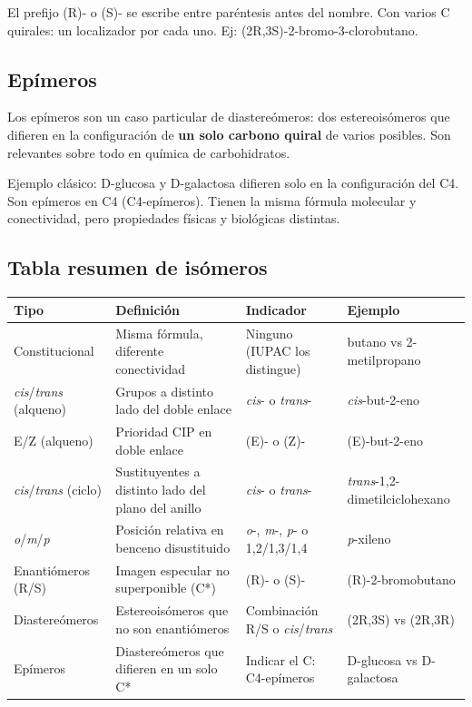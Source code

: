 El prefijo (R)- o (S)- se escribe entre paréntesis antes del nombre. Con varios C quirales:
un localizador por cada uno. Ej: (2R,3S)-2-bromo-3-clorobutano.

{}
\subsection*{\textcolor{blueunam}{Epímeros}}

Los epímeros son un caso particular de diastereómeros: dos estereoisómeros que difieren
en la configuración de \textbf{un solo carbono quiral} de varios posibles. Son relevantes
sobre todo en química de carbohidratos.

Ejemplo clásico: D-glucosa y D-galactosa difieren solo en la configuración del C4.
Son epímeros en C4 (C4-epímeros). Tienen la misma fórmula molecular y conectividad,
pero propiedades físicas y biológicas distintas.

{}
\subsection*{\textcolor{blueunam}{Tabla resumen de isómeros}}

\renewcommand{\arraystretch}{1.5}
\begin{longtable}{L{2.8cm} L{4.0cm} L{2.8cm} L{4.0cm}}
\toprule
\textbf{Tipo} & \textbf{Definición} & \textbf{Indicador} & \textbf{Ejemplo} \\
\midrule\endhead\bottomrule\endlastfoot
Constitucional & Misma fórmula, diferente conectividad & Ninguno (IUPAC los distingue) & butano vs 2-metilpropano \\
\textit{cis}/\textit{trans} (alqueno) & Grupos a distinto lado del doble enlace & \textit{cis}- o \textit{trans}- & \textit{cis}-but-2-eno \\
E/Z (alqueno) & Prioridad CIP en doble enlace & (E)- o (Z)- & (E)-but-2-eno \\
\textit{cis}/\textit{trans} (ciclo) & Sustituyentes a distinto lado del plano del anillo & \textit{cis}- o \textit{trans}- & \textit{trans}-1,2-dimetilciclohexano \\
\textit{o}/\textit{m}/\textit{p} & Posición relativa en benceno disustituido & \textit{o}-, \textit{m}-, \textit{p}- o 1,2/1,3/1,4 & \textit{p}-xileno \\
Enantiómeros (R/S) & Imagen especular no superponible (C*) & (R)- o (S)- & (R)-2-bromobutano \\
Diastereómeros & Estereoisómeros que no son enantiómeros & Combinación R/S o \textit{cis}/\textit{trans} & (2R,3S) vs (2R,3R) \\
Epímeros & Diastereómeros que difieren en un solo C* & Indicar el C: C4-epímeros & D-glucosa vs D-galactosa \\
\end{longtable}

